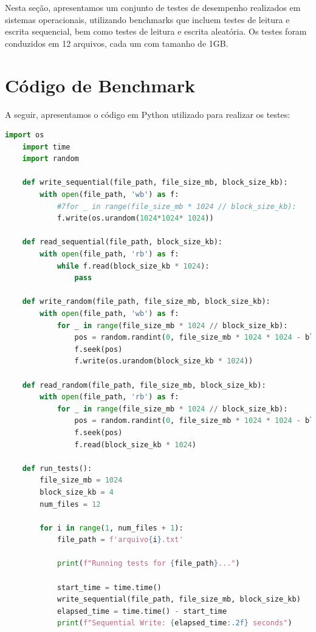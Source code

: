 \documentclass[
	12pt,				%
	openright,			%
	oneside,			%
	a4paper,			%
	chapter=TITLE,		%
	english,			%
	french,				%
	spanish,			%
	brazil				%
	]{abntex2}
\theoremstyle{definition}
\begin{document}
\lstset{style=dracula}




Nesta seção, apresentamos um conjunto de testes de desempenho realizados em 
sistemas operacionais, utilizando benchmarks que incluem testes de leitura e 
escrita sequencial, bem como testes de leitura e escrita aleatória. Os testes 
foram conduzidos em 12 arquivos, cada um com tamanho de 1GB.

\section{Código de Benchmark}

A seguir, apresentamos o código em Python utilizado para realizar os testes:

\begin{lstlisting}[language=Python, caption={Código de Benchmark}, label=benchmark_code]
	import os
	import time
	import random
	
	def write_sequential(file_path, file_size_mb, block_size_kb):
		with open(file_path, 'wb') as f:
			#7for _ in range(file_size_mb * 1024 // block_size_kb):
			f.write(os.urandom(1024*1024* 1024))
	
	def read_sequential(file_path, block_size_kb):
		with open(file_path, 'rb') as f:
			while f.read(block_size_kb * 1024):
				pass
	
	def write_random(file_path, file_size_mb, block_size_kb):
		with open(file_path, 'wb') as f:
			for _ in range(file_size_mb * 1024 // block_size_kb):
				pos = random.randint(0, file_size_mb * 1024 * 1024 - block_size_kb * 1024)
				f.seek(pos)
				f.write(os.urandom(block_size_kb * 1024))
	
	def read_random(file_path, file_size_mb, block_size_kb):
		with open(file_path, 'rb') as f:
			for _ in range(file_size_mb * 1024 // block_size_kb):
				pos = random.randint(0, file_size_mb * 1024 * 1024 - block_size_kb * 1024)
				f.seek(pos)
				f.read(block_size_kb * 1024)
	
	def run_tests():
		file_size_mb = 1024
		block_size_kb = 4
		num_files = 12
	
		for i in range(1, num_files + 1):
			file_path = f'arquivo{i}.txt'
	
			print(f"Running tests for {file_path}...")
			
			start_time = time.time()
			write_sequential(file_path, file_size_mb, block_size_kb)
			elapsed_time = time.time() - start_time
			print(f"Sequential Write: {elapsed_time:.2f} seconds")
	

\end{lstlisting}
\end{document}
